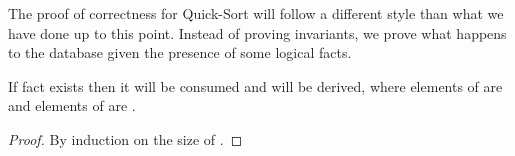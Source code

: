 The proof of correctness for Quick-Sort will follow a different style than what
we have done up to this point. Instead of proving invariants, we prove what
happens to the database given the presence of some logical facts.

\begin{lemma}

If fact  exists then it will be consumed
and  will be
derived, where elements of  are \code{<=}  and elements
of  are .

\end{lemma}
\begin{proof}
By induction on the size of .
\end{proof}

